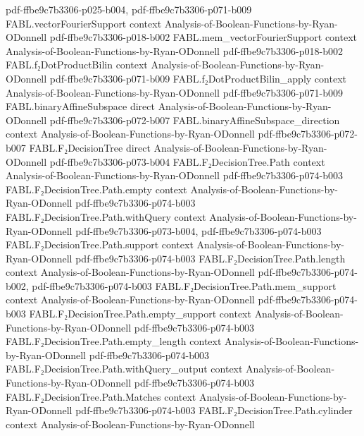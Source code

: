 \begin{theorem}
  {pdf-ffbe9c7b3306-p025-b004,
    pdf-ffbe9c7b3306-p071-b009}
\proofstep
  {FABL.vectorFourierSupport}
  {context}
  {Analysis-of-Boolean-Functions-by-Ryan-ODonnell}
  {pdf-ffbe9c7b3306-p018-b002}
\proofstep
  {FABL.mem_vectorFourierSupport}
  {context}
  {Analysis-of-Boolean-Functions-by-Ryan-ODonnell}
  {pdf-ffbe9c7b3306-p018-b002}
\proofstep
  {FABL.f₂DotProductBilin}
  {context}
  {Analysis-of-Boolean-Functions-by-Ryan-ODonnell}
  {pdf-ffbe9c7b3306-p071-b009}
\proofstep
  {FABL.f₂DotProductBilin_apply}
  {context}
  {Analysis-of-Boolean-Functions-by-Ryan-ODonnell}
  {pdf-ffbe9c7b3306-p071-b009}
\proofstep
  {FABL.binaryAffineSubspace}
  {direct}
  {Analysis-of-Boolean-Functions-by-Ryan-ODonnell}
  {pdf-ffbe9c7b3306-p072-b007}
\proofstep
  {FABL.binaryAffineSubspace_direction}
  {context}
  {Analysis-of-Boolean-Functions-by-Ryan-ODonnell}
  {pdf-ffbe9c7b3306-p072-b007}
\proofstep
  {FABL.F₂DecisionTree}
  {direct}
  {Analysis-of-Boolean-Functions-by-Ryan-ODonnell}
  {pdf-ffbe9c7b3306-p073-b004}
\proofstep
  {FABL.F₂DecisionTree.Path}
  {context}
  {Analysis-of-Boolean-Functions-by-Ryan-ODonnell}
  {pdf-ffbe9c7b3306-p074-b003}
\proofstep
  {FABL.F₂DecisionTree.Path.empty}
  {context}
  {Analysis-of-Boolean-Functions-by-Ryan-ODonnell}
  {pdf-ffbe9c7b3306-p074-b003}
\proofstep
  {FABL.F₂DecisionTree.Path.withQuery}
  {context}
  {Analysis-of-Boolean-Functions-by-Ryan-ODonnell}
  {pdf-ffbe9c7b3306-p073-b004,
    pdf-ffbe9c7b3306-p074-b003}
\proofstep
  {FABL.F₂DecisionTree.Path.support}
  {context}
  {Analysis-of-Boolean-Functions-by-Ryan-ODonnell}
  {pdf-ffbe9c7b3306-p074-b003}
\proofstep
  {FABL.F₂DecisionTree.Path.length}
  {context}
  {Analysis-of-Boolean-Functions-by-Ryan-ODonnell}
  {pdf-ffbe9c7b3306-p074-b002,
    pdf-ffbe9c7b3306-p074-b003}
\proofstep
  {FABL.F₂DecisionTree.Path.mem_support}
  {context}
  {Analysis-of-Boolean-Functions-by-Ryan-ODonnell}
  {pdf-ffbe9c7b3306-p074-b003}
\proofstep
  {FABL.F₂DecisionTree.Path.empty_support}
  {context}
  {Analysis-of-Boolean-Functions-by-Ryan-ODonnell}
  {pdf-ffbe9c7b3306-p074-b003}
\proofstep
  {FABL.F₂DecisionTree.Path.empty_length}
  {context}
  {Analysis-of-Boolean-Functions-by-Ryan-ODonnell}
  {pdf-ffbe9c7b3306-p074-b003}
\proofstep
  {FABL.F₂DecisionTree.Path.withQuery_output}
  {context}
  {Analysis-of-Boolean-Functions-by-Ryan-ODonnell}
  {pdf-ffbe9c7b3306-p074-b003}
\proofstep
  {FABL.F₂DecisionTree.Path.Matches}
  {context}
  {Analysis-of-Boolean-Functions-by-Ryan-ODonnell}
  {pdf-ffbe9c7b3306-p074-b003}
\proofstep
  {FABL.F₂DecisionTree.Path.cylinder}
  {context}
  {Analysis-of-Boolean-Functions-by-Ryan-ODonnell}

\end{theorem}
